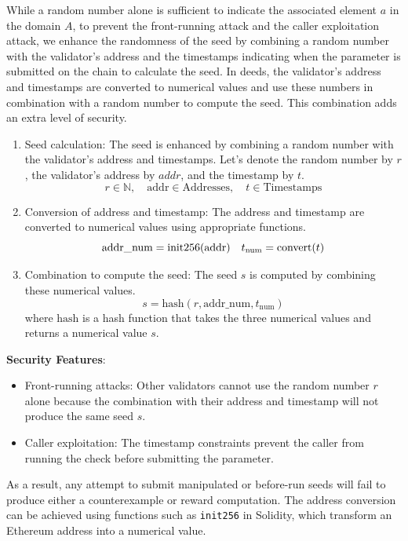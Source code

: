 \documentclass[runningheads]{llncs}
\begin{document}
While a random number alone is sufficient to indicate the associated element $a$ in the domain $A$, to prevent the front-running attack and the caller exploitation attack, we enhance the randomness of the seed by combining a random number with the validator's address and the timestamps indicating when the parameter is submitted on the chain to calculate the seed. In deeds, the validator's address and timestamps are converted to numerical values and use these numbers in combination with a random number to compute the seed. This combination adds an extra level of security. 
\begin{enumerate}
\item 
Seed calculation: The seed is enhanced by combining a random number with the validator's address and timestamps. Let's denote the random number by $r$, the validator's address by $addr$, and the timestamp by $t$.
\begin{equation}
r \in \mathbb{N}, \quad \text{addr} \in \text{Addresses}, \quad t \in \text{Timestamps}
\end{equation}
\item Conversion of address and timestamp: The address and timestamp are converted to numerical values using appropriate functions.
\begin{equation}
\text{addr\_num} = \text{init256}(\text{addr}) \\
 \quad t_{\text{num}} = \text{convert}(t)
\end{equation}
\item Combination to compute the seed: The seed $s$ is computed by combining these numerical values.
\begin{equation}
s = \text{hash}(r, \text{addr\_num}, t_{\text{num}})
\end{equation}
where \(\text{hash}\) is a hash function that takes the three numerical values and returns a numerical value \( s \).
\end{enumerate}

\textbf{Security Features}:
\begin{itemize}
    \item Front-running attacks: Other validators cannot use the random number $r$ alone because the combination with their address and timestamp will not produce the same seed $s$.
    \item Caller exploitation: The timestamp constraints prevent the caller from running the check before submitting the parameter.
\end{itemize}
As a result, any attempt to submit manipulated or before-run seeds will fail to produce either a counterexample or reward computation. The address conversion can be achieved using functions such as \lstinline|init256| in Solidity, which transform an Ethereum address into a numerical value. 
\end{document}
